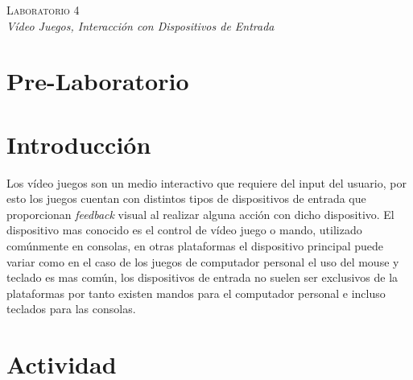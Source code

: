 \begin{center}
\textsc{\Large Laboratorio 4}~\\
\emph{\large Vídeo Juegos, Interacción con Dispositivos de Entrada}
\end{center}

\section{Pre-Laboratorio}

\section{Introducción}
Los vídeo juegos son un medio interactivo que requiere del input del usuario, por esto los juegos cuentan con distintos tipos de dispositivos de entrada que proporcionan \emph{feedback} visual al realizar alguna acción con dicho dispositivo. El dispositivo mas conocido es el control de vídeo juego o mando, utilizado comúnmente en consolas, en otras plataformas el dispositivo principal puede variar como en el caso de los juegos de computador personal el uso del mouse y teclado es mas común, los dispositivos de entrada no suelen ser exclusivos de la plataformas por tanto existen mandos para el computador personal e incluso teclados para las consolas.

\section{Actividad}
